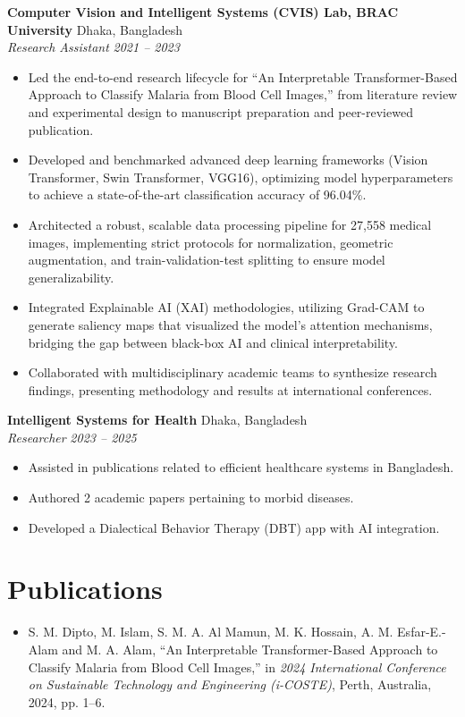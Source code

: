 \documentclass[a4paper,10pt]{article}
\newcommand{\entry}[4]{%
  \noindent\textbf{#1} \hfill #2\\
  \textit{#3} \hfill \textit{#4}\par\vspace{2pt}
}
\begin{document}
\entry{Computer Vision and Intelligent Systems (CVIS) Lab, BRAC University}{Dhaka, Bangladesh}{Research Assistant}{2021 -- 2023}
\begin{itemize}
  \item Led the end-to-end research lifecycle for ``An Interpretable Transformer-Based Approach to Classify Malaria from Blood Cell Images,'' from literature review and experimental design to manuscript preparation and peer-reviewed publication.
  \item Developed and benchmarked advanced deep learning frameworks (Vision Transformer, Swin Transformer, VGG16), optimizing model hyperparameters to achieve a state-of-the-art classification accuracy of 96.04\%.
  \item Architected a robust, scalable data processing pipeline for 27,558 medical images, implementing strict protocols for normalization, geometric augmentation, and train-validation-test splitting to ensure model generalizability.
  \item Integrated Explainable AI (XAI) methodologies, utilizing Grad-CAM to generate saliency maps that visualized the model's attention mechanisms, bridging the gap between black-box AI and clinical interpretability.
  \item Collaborated with multidisciplinary academic teams to synthesize research findings, presenting methodology and results at international conferences.
\end{itemize}

\entry{Intelligent Systems for Health}{Dhaka, Bangladesh}{Researcher}{2023 -- 2025}
\begin{itemize}
  \item Assisted in publications related to efficient healthcare systems in Bangladesh.
  \item Authored 2 academic papers pertaining to morbid diseases.
  \item Developed a Dialectical Behavior Therapy (DBT) app with AI integration.
\end{itemize}

\section{Publications}
\begin{itemize}
  \item S. M. Dipto, M. Islam, S. M. A. Al Mamun, M. K. Hossain, A. M. Esfar-E.-Alam and M. A. Alam, ``An Interpretable Transformer-Based Approach to Classify Malaria from Blood Cell Images,'' in \textit{2024 International Conference on Sustainable Technology and Engineering (i-COSTE)}, Perth, Australia, 2024, pp. 1--6.
\end{itemize}
\end{document}
